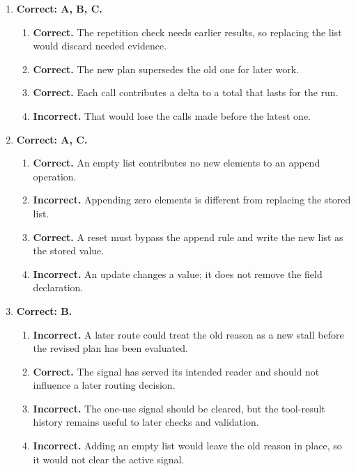 \begin{enumerate}[start=11,itemsep=0.7\baselineskip]
\item[{\hyperref[exercise:14]{14.}}] \begin{minipage}[t]{\linewidth}
\textbf{Correct: A, B, C.}
\begin{enumerate}[label=\textnormal{(\Alph*)},leftmargin=*,itemsep=0pt]
\item \textbf{Correct.} The repetition check needs earlier results, so replacing the list would discard needed evidence.
\item \textbf{Correct.} The new plan supersedes the old one for later work.
\item \textbf{Correct.} Each call contributes a delta to a total that lasts for the run.
\item \textbf{Incorrect.} That would lose the calls made before the latest one.
\end{enumerate}
\end{minipage}

\item[{\hyperref[exercise:15]{15.}}] \begin{minipage}[t]{\linewidth}
\textbf{Correct: A, C.}
\begin{enumerate}[label=\textnormal{(\Alph*)},leftmargin=*,itemsep=0pt]
\item \textbf{Correct.} An empty list contributes no new elements to an append operation.
\item \textbf{Incorrect.} Appending zero elements is different from replacing the stored list.
\item \textbf{Correct.} A reset must bypass the append rule and write the new list as the stored value.
\item \textbf{Incorrect.} An update changes a value; it does not remove the field declaration.
\end{enumerate}
\end{minipage}

\item[{\hyperref[exercise:16]{16.}}] \begin{minipage}[t]{\linewidth}
\textbf{Correct: B.}
\begin{enumerate}[label=\textnormal{(\Alph*)},leftmargin=*,itemsep=0pt]
\item \textbf{Incorrect.} A later route could treat the old reason as a new stall before the revised plan has been evaluated.
\item \textbf{Correct.} The signal has served its intended reader and should not influence a later routing decision.
\item \textbf{Incorrect.} The one-use signal should be cleared, but the tool-result history remains useful to later checks and validation.
\item \textbf{Incorrect.} Adding an empty list would leave the old reason in place, so it would not clear the active signal.
\end{enumerate}
\end{minipage}


\end{enumerate}
